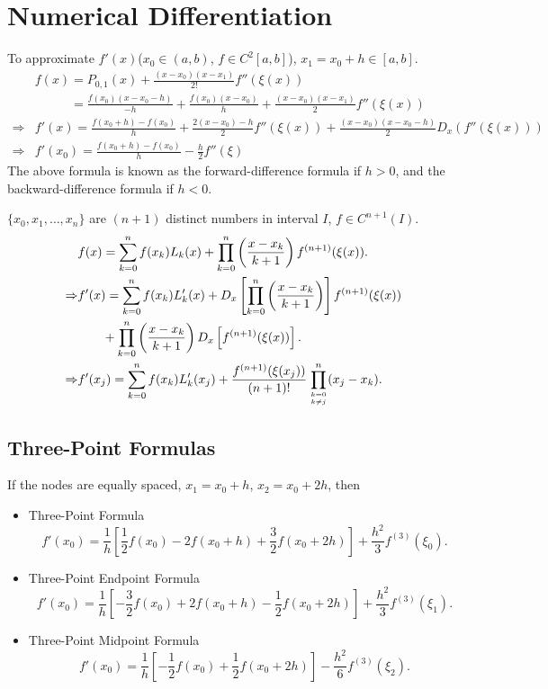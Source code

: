 \section{Numerical Differentiation}
To approximate $f'(x)$($x_0\in(a,b)$, $f\in C^2[a,b]$), $x_1=x_0+h\in[a,b]$.
\begin{align*}
    & f(x) = P_{0,1}(x)+\frac{(x-x_0)(x-x_1)}{2!}f''(\xi(x)) \\
    & \phantom{f(x)} = \frac{f(x_0)(x-x_0-h)}{-h}+\frac{f(x_0)(x-x_0)}{h}+\frac{(x-x_0)(x-x_1)}{2}f''(\xi(x)) \\
    \Rightarrow & f'(x) = \frac{f(x_0+h)-f(x_0)}{h}+\frac{2(x-x_0)-h}{2}f''(\xi(x))+\frac{(x-x_0)(x-x_0-h)}{2}D_x\left(f''(\xi(x))\right) \\
    \Rightarrow & f'(x_0)=\frac{f(x_0+h)-f(x_0)}{h}-\frac{h}{2}f''(\xi)
\end{align*}
The above formula is known as the forward-difference formula if $h>0$, and the backward-difference formula if $h<0$.

\begin{theo}
$\{x_0,x_1,\ldots,x_n\}$ are $(n+1)$ distinct numbers in interval $I$, $f\in C^{n+1}(I)$.
\begin{align*}
    & f(x) = \sum_{k=0}^nf(x_k)L_k(x)+\prod_{k=0}^n\left(\frac{x-x_k}{k+1}\right)f^{(n+1)}(\xi(x)). \\
    \Rightarrow & f'(x) = \sum_{k=0}^nf(x_k)L_k'(x)+D_x\left[\prod_{k=0}^n\left(\frac{x-x_k}{k+1}\right)\right]f^{(n+1)}(\xi(x)) \\
    & \phantom{f(x)} + \prod_{k=0}^n\left(\frac{x-x_k}{k+1}\right) D_x\left[f^{(n+1)}(\xi(x))\right]. \\
    \Rightarrow & f'(x_j) = \sum_{k=0}^nf(x_k)L_k'(x_j)+\frac{f^{(n+1)}(\xi(x_j))}{(n+1)!}\prod_{k=0 \atop k\neq j}^n(x_j-x_k).
\end{align*}
\end{theo}

\subsection{Three-Point Formulas}
If the nodes are equally spaced, $x_1=x_0+h$, $x_2=x_0+2h$, then
\begin{itemize}
    \item Three-Point Formula
    \[
     f'(x_0) = \frac{1}{h}\left[\frac{1}{2}f(x_0)-2f(x_0+h)+\frac{3}{2}f(x_0+2h)\right] + \frac{h^2}{3}f^{(3)}(\xi_0).
    \]
    \item Three-Point Endpoint Formula
    \[
     f'(x_0) = \frac{1}{h}\left[-\frac{3}{2}f(x_0)+2f(x_0+h)-\frac{1}{2}f(x_0+2h)\right] + \frac{h^2}{3}f^{(3)}(\xi_1).
    \]
    \item Three-Point Midpoint Formula
    \[
     f'(x_0) = \frac{1}{h}\left[-\frac{1}{2}f(x_0)+\frac{1}{2}f(x_0+2h)\right] - \frac{h^2}{6}f^{(3)}(\xi_2).
    \]
\end{itemize}

